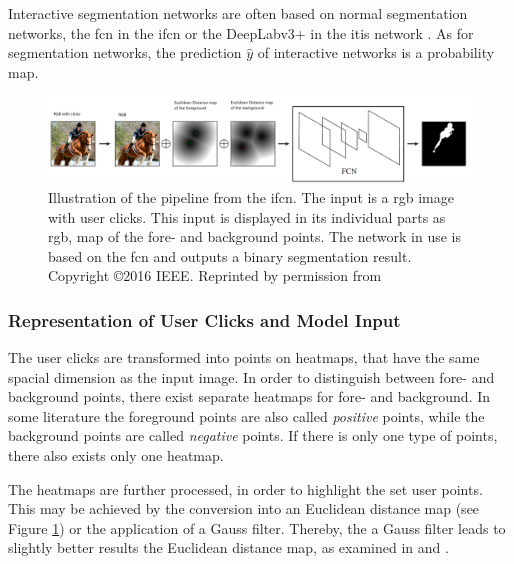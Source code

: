 Interactive segmentation networks are often based on normal segmentation networks, \eg the \gls{fcn} in the \gls{ifcn} \cite{Xu16-InteractiveObjectSelection} or the DeepLabv3+ in the \gls{itis} network \cite{MVL18-ITIS}.
As for segmentation networks, the prediction $\hat{y}$ of interactive networks is a probability map.

\begin{figure}
	\includegraphics[width=\linewidth]{figures/chap232_ifcn.png}
	\caption[Interactively Fully Convolutional Network]{
		Illustration of the pipeline from the \gls{ifcn}.
		The input is a \gls{rgb} image with user clicks.
		This input is displayed in its individual parts as \gls{rgb}, map of the fore- and background points.
		The network in use is based on the \gls{fcn} and outputs a binary segmentation result.
		Copyright \copyright 2016 IEEE. Reprinted by permission from \cite{Xu16-InteractiveObjectSelection}
	}\label{fig:ch2:sec3:ifcn}
\end{figure}

\subsubsection{Representation of User Clicks and Model Input}
The user clicks are transformed into points on heatmaps, that have the same spacial dimension as the input image.
In order to distinguish between fore- and background points, there exist separate heatmaps for fore- and background.
In some literature the foreground points are also called \textit{positive} points, while the background points are called \textit{negative} points.
If there is only one type of points, there also exists only one heatmap.

The heatmaps are further processed, in order to highlight the set user points.
This may be achieved by the conversion into an Euclidean distance map \cite{Dan80-EuclideanDistanceMapping} (see Figure \ref{fig:ch2:sec3:ifcn}) or the application of a Gauss filter.
Thereby, the a Gauss filter leads to slightly better results the Euclidean distance map, as examined in \cite{Man18-DEXTR} and \cite{MVL18-ITIS}.


